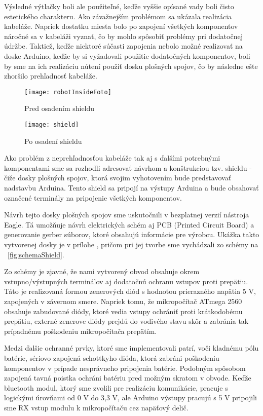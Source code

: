 Výsledné výtlačky boli ale použiteľné, keďže vyššie opísané vady boli čisto estetického charakteru. Ako závažnejším problémom sa ukázala realizácia kabeláže. Napriek dostatku miesta bolo po zapojení všetkých komponentov náročné sa v kabeláži vyznať, čo by mohlo spôsobiť problémy pri dodatočnej údržbe. Taktiež, keďže niektoré súčasti zapojenia nebolo možné realizovať na doske Arduino, keďže by si vyžadovali použitie dodatočných komponentov, boli by sme na ich realizáciu nútení použiť dosku plošných spojov, čo by následne ešte zhoršilo prehľadnosť kabeláže.


\begin{figure}[h]
\centering
\begin{minipage}[b]{0.48\textwidth}
\centering
\texttt{[image: robotInsideFoto]}
\caption{Pred osadením shieldu}
\label{fig:robot_no_shield}
\end{minipage}\quad
\begin{minipage}[b]{0.48\textwidth}
\centering
\texttt{[image: shield]}
\caption{Po osadení shieldu}
\label{fig:robot_shield}
\end{minipage}
\label{fig:comparison}
\end{figure}

Ako problém z neprehľadnosťou kabeláže tak aj s ďalšími potrebnými komponentami sme sa rozhodli adresovať návrhom a konštrukciou tzv. shieldu - čiže dosky plošných spojov, ktorá svojim vyhotovením bude predstavovať nadstavbu Arduina. Tento shield sa pripojí na výstupy Arduina a bude obsahovať označené terminály na pripojenie všetkých komponentov.

Návrh tejto dosky plošných spojov sme uskutočnili v bezplatnej verzií nástroja Eagle. Tá umožňuje návrh elektrických schém aj PCB (Printed Circuit Board) a generovanie gerber súborov, ktoré obsahujú informácie pre výrobcu. Ukážka takto vytvorenej dosky je v prílohe , pričom pri jej tvorbe sme vychádzali zo schémy na \figurename~\ref{fig:schemaShield}. 

Zo schémy je zjavné, že nami vytvorený obvod obsahuje okrem vstupno/výstupných terminálov aj dodatočnú ochranu vstupov proti prepätiu. Táto je realizovaná formou zenerových diód s hodnotou prierazného napätia 5 V, zapojených v závernom smere. Napriek tomu, že mikropočítač ATmega 2560 obsahuje zabudované diódy, ktoré vedia vstupy ochrániť proti krátkodobému prepätiu, externé zenerove diódy prejdú do vodivého stavu skôr a zabránia tak prípadnému poškodeniu mikropočítača prepätím. 

Medzi ďalšie ochranné prvky, ktoré sme implementovali patrí, voči kladnému pólu batérie, sériovo zapojená schottkyho dióda, ktorá zabráni poškodeniu komponentov v prípade nesprávneho pripojenia batérie. Podobným spôsobom zapojená tavná poistka ochráni batériu pred možným skratom v obvode.  Keďže bluetooth modul, ktorý sme zvolili pre realizáciu komunikácie, pracuje s logickými úrovňami od 0 V do 3,3 V, ale Arduino výstupy pracujú s 5 V pripojili sme RX vstup modulu k mikropočítaču cez napäťový delič. 

